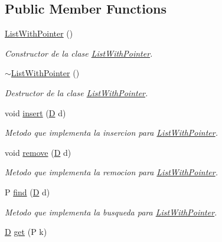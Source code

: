 \subsection*{Public Member Functions}
\begin{DoxyCompactItemize}
\item 
\hyperlink{class_list_with_pointer_a53b1284b13bf834bc5fc1eb27368a283}{List\+With\+Pointer} ()
\begin{DoxyCompactList}\small\item\em Constructor de la clase \hyperlink{class_list_with_pointer}{List\+With\+Pointer}. \end{DoxyCompactList}\item 
\hyperlink{class_list_with_pointer_a2a19c2e6e9bdee1c56750e36d6bbd7c2}{$\sim$\+List\+With\+Pointer} ()
\begin{DoxyCompactList}\small\item\em Destructor de la clase \hyperlink{class_list_with_pointer}{List\+With\+Pointer}. \end{DoxyCompactList}\item 
void \hyperlink{class_list_with_pointer_a676e57683ade8e179e8eff5885f7309a}{insert} (\hyperlink{gwp_2main_8cpp_af316c33cc298530f245e8b55330e86b5}{D} d)
\begin{DoxyCompactList}\small\item\em Metodo que implementa la insercion para \hyperlink{class_list_with_pointer}{List\+With\+Pointer}. \end{DoxyCompactList}\item 
void \hyperlink{class_list_with_pointer_abcb151e95e9fffea7f9f7af593d8176f}{remove} (\hyperlink{gwp_2main_8cpp_af316c33cc298530f245e8b55330e86b5}{D} d)
\begin{DoxyCompactList}\small\item\em Metodo que implementa la remocion para \hyperlink{class_list_with_pointer}{List\+With\+Pointer}. \end{DoxyCompactList}\item 
P \hyperlink{class_list_with_pointer_afeff8b963c197378553e2a3f73eaf66a}{find} (\hyperlink{gwp_2main_8cpp_af316c33cc298530f245e8b55330e86b5}{D} d)
\begin{DoxyCompactList}\small\item\em Metodo que implementa la busqueda para \hyperlink{class_list_with_pointer}{List\+With\+Pointer}. \end{DoxyCompactList}\item 
\hyperlink{gwp_2main_8cpp_af316c33cc298530f245e8b55330e86b5}{D} \hyperlink{class_list_with_pointer_a0ff36c852334da8bc167356e636c1846}{get} (P k)

\end{DoxyCompactItemize}
